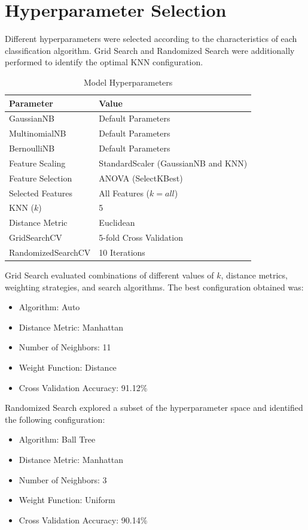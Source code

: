 \documentclass[12pt,a4paper]{article}
\begin{document}
	\section{Hyperparameter Selection}
	
	Different hyperparameters were selected according to the characteristics of each classification algorithm. Grid Search and Randomized Search were additionally performed to identify the optimal KNN configuration.
	
	\begin{table}[H]
		\centering
		\caption{Model Hyperparameters}
		\begin{tabular}{ll}
			\toprule
			Parameter & Value\\
			\midrule
			GaussianNB & Default Parameters\\
			MultinomialNB & Default Parameters\\
			BernoulliNB & Default Parameters\\
			Feature Scaling & StandardScaler (GaussianNB and KNN)\\
			Feature Selection & ANOVA (SelectKBest)\\
			Selected Features & All Features ($k=all$)\\
			KNN ($k$) & 5\\
			Distance Metric & Euclidean\\
			GridSearchCV & 5-fold Cross Validation\\
			RandomizedSearchCV & 10 Iterations\\
			\bottomrule
		\end{tabular}
	\end{table}
	
	Grid Search evaluated combinations of different values of $k$, distance metrics, weighting strategies, and search algorithms. The best configuration obtained was:
	
	\begin{itemize}
		\item Algorithm: Auto
		\item Distance Metric: Manhattan
		\item Number of Neighbors: 11
		\item Weight Function: Distance
		\item Cross Validation Accuracy: 91.12\%
	\end{itemize}
	
	Randomized Search explored a subset of the hyperparameter space and identified the following configuration:
	
	\begin{itemize}
		\item Algorithm: Ball Tree
		\item Distance Metric: Manhattan
		\item Number of Neighbors: 3
		\item Weight Function: Uniform
		\item Cross Validation Accuracy: 90.14\%
	\end{itemize}
\end{document}
